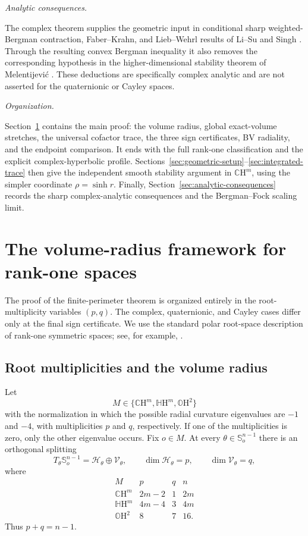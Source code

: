 \documentclass[11pt,reqno]{amsart}
\numberwithin{equation}{section}
\theoremstyle{definition}
\theoremstyle{remark}
\newcommand{\CH}{\mathbb{C}\mathrm{H}}
\newcommand{\HH}{\mathbb{H}\mathrm{H}}
\newcommand{\OH}{\mathbb{O}\mathrm{H}}
\newcommand{\ithead}[1]{%
  \par\medskip\noindent\textit{#1}\enspace
}
\begin{document}
\ithead{Analytic consequences.}
The complex theorem supplies the geometric input in conditional sharp
weighted-Bergman contraction, Faber--Krahn, and Lieb--Wehrl results of Li--Su
and Singh \cite{LiSu2025,Singh2026}.  Through the resulting convex Bergman
inequality it also removes the corresponding hypothesis in the
higher-dimensional stability theorem of Melentijevi\'c
\cite[Theorem~4]{Melentijevic2025}.  These deductions are specifically
complex analytic and are not asserted for the quaternionic or Cayley spaces.

\ithead{Organization.}
Section~\ref{sec:rank-one-framework} contains the main proof: the volume
radius, global exact-volume stretches, the universal cofactor trace, the
three sign certificates, BV radiality, and the endpoint comparison.  It ends
with the full rank-one classification and the explicit complex-hyperbolic
profile.  Sections~\ref{sec:geometric-setup}--\ref{sec:integrated-trace} then
give the independent smooth stability argument in $\CH^m$, using the simpler
coordinate $\rho=\sinh r$.  Finally,
Section~\ref{sec:analytic-consequences} records the sharp complex-analytic
consequences and the Bergman--Fock scaling limit.

\section{The volume-radius framework for rank-one spaces}
\label{sec:rank-one-framework}

The proof of the finite-perimeter theorem is organized entirely in the
root-multiplicity variables $(p,q)$.  The complex, quaternionic, and Cayley
cases differ only at the final sign certificate.  We use the standard polar
root-space description of rank-one symmetric spaces; see, for example,
\cite{Silini2024}.

\subsection{Root multiplicities and the volume radius}

Let
\[
M\in\{\CH^m,\HH^m,\OH^2\}
\]
with the normalization in which the possible radial curvature eigenvalues are
$-1$ and $-4$, with multiplicities $p$ and $q$, respectively.  If one of the
multiplicities is zero, only the other eigenvalue occurs.  Fix $o\in M$.  At every
$\theta\in\mathbb S_o^{n-1}$ there is an orthogonal splitting
\begin{equation}
T_\theta\mathbb S_o^{n-1}
=
\mathcal H_\theta\oplus\mathcal V_\theta,
\qquad
\dim\mathcal H_\theta=p,
\qquad
\dim\mathcal V_\theta=q,
\label{eq:rank-one-angular-splitting}
\end{equation}
where
\[
\begin{array}{c|c|c|c}
M&p&q&n\\ \hline
\CH^m&2m-2&1&2m\\
\HH^m&4m-4&3&4m\\
\OH^2&8&7&16.
\end{array}
\]
Thus $p+q=n-1$.
\end{document}
